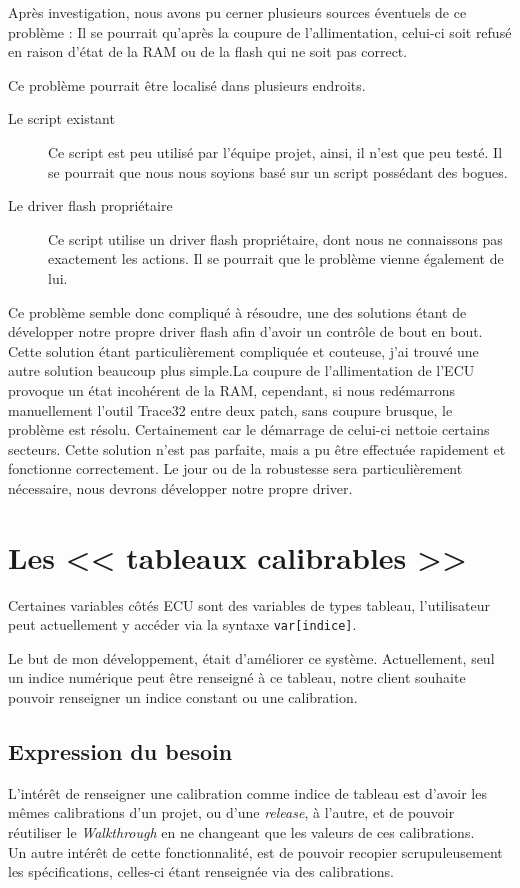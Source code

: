 Après investigation, nous avons pu cerner plusieurs sources éventuels de ce problème : 
Il se pourrait qu'après la coupure de l'allimentation, celui-ci soit refusé en raison d'état de la RAM ou de la flash qui ne soit pas correct. 

Ce problème pourrait être localisé dans plusieurs endroits.
\begin{description}
\item[Le script existant] Ce script est peu utilisé par l'équipe projet, ainsi, il n'est que peu testé. Il se pourrait que nous nous soyions basé sur un script possédant des bogues.
\item[Le driver flash propriétaire] Ce script utilise un driver flash propriétaire, dont nous ne connaissons pas exactement les actions. Il se pourrait que le problème vienne également de lui.
\end{description}

Ce problème semble donc compliqué à résoudre, une des solutions étant de développer notre propre driver flash afin d'avoir un contrôle de bout en bout. Cette solution étant particulièrement compliquée et couteuse, j'ai trouvé une autre solution beaucoup plus simple.\newline La coupure de l'allimentation de l'ECU provoque un état incohérent de la RAM, cependant, si nous redémarrons manuellement l'outil Trace32 entre deux patch, sans coupure brusque, le problème est résolu. Certainement car le démarrage de celui-ci nettoie certains secteurs. Cette solution n'est pas parfaite, mais a pu être effectuée rapidement et fonctionne correctement. Le jour ou de la robustesse sera particulièrement nécessaire, nous devrons développer notre propre driver.

\section{Les << tableaux calibrables >>}
Certaines variables côtés ECU sont des variables de types tableau, l’utilisateur peut actuellement y accéder via la syntaxe \texttt{var[indice]}.

Le but de mon développement, était d’améliorer ce système. Actuellement, seul un indice numérique peut être renseigné à ce tableau, notre client souhaite pouvoir renseigner un indice constant ou une calibration.

\subsection{Expression du besoin}\label{besoinTab}
L'intérêt de renseigner une calibration comme indice de tableau est d’avoir les mêmes calibrations d’un projet, ou d'une \textit{release}, à l’autre, et de pouvoir réutiliser le \textit{Walkthrough} en ne changeant que les valeurs de ces calibrations.\\
Un autre intérêt de cette fonctionnalité, est de pouvoir recopier scrupuleusement les spécifications, celles-ci étant renseignée via des calibrations.


